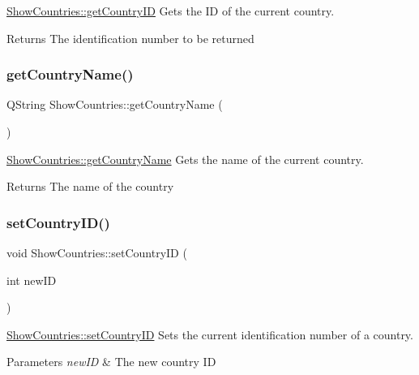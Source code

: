 \hyperlink{class_show_countries_a02956713871e89645487500f3c9b77b8}{Show\+Countries\+::get\+Country\+ID} Gets the ID of the current country. 

\begin{DoxyReturn}{Returns}
The identification number to be returned 
\end{DoxyReturn}
\mbox{\label{class_show_countries_afc6d5f6817bd4c9388aef3d52d09d768}} 
\subsubsection{\texorpdfstring{get\+Country\+Name()}{getCountryName()}}
{\footnotesize\ttfamily Q\+String Show\+Countries\+::get\+Country\+Name (\begin{DoxyParamCaption}{ }\end{DoxyParamCaption})}



\hyperlink{class_show_countries_afc6d5f6817bd4c9388aef3d52d09d768}{Show\+Countries\+::get\+Country\+Name} Gets the name of the current country. 

\begin{DoxyReturn}{Returns}
The name of the country 
\end{DoxyReturn}
\mbox{\label{class_show_countries_a751b9d3c6859102f48d3ecc254135906}} 
\subsubsection{\texorpdfstring{set\+Country\+I\+D()}{setCountryID()}}
{\footnotesize\ttfamily void Show\+Countries\+::set\+Country\+ID (\begin{DoxyParamCaption}\item[{int}]{new\+ID }\end{DoxyParamCaption})}



\hyperlink{class_show_countries_a751b9d3c6859102f48d3ecc254135906}{Show\+Countries\+::set\+Country\+ID} Sets the current identification number of a country. 


\begin{DoxyParams}{Parameters}
{\em new\+ID} & The new country ID \\
\hline
\end{DoxyParams}
\mbox{\label{class_show_countries_aefa9daeff484f4028ea5a280b280dd36}} 
